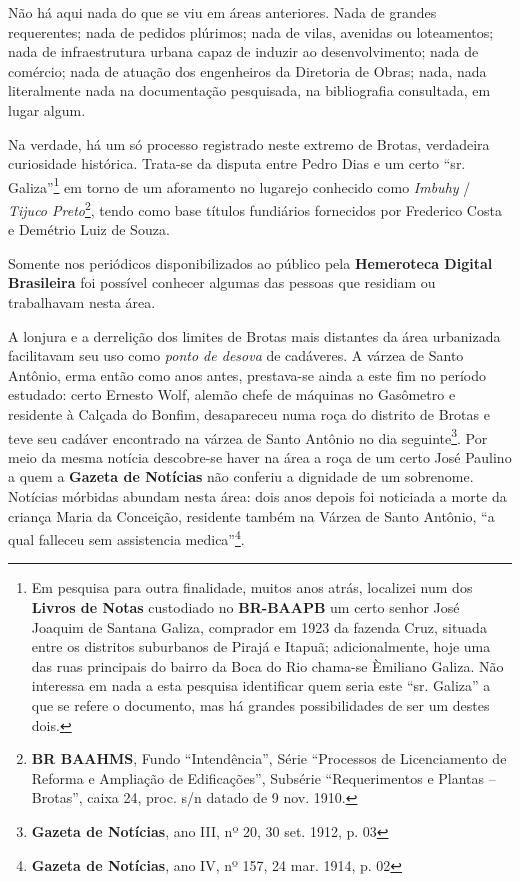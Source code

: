 



Não há aqui nada do que se viu em áreas anteriores. Nada de grandes requerentes; nada de pedidos plúrimos; nada de vilas, avenidas ou loteamentos; nada de infraestrutura urbana capaz de induzir ao desenvolvimento; nada de comércio; nada de atuação dos engenheiros da Diretoria de Obras; nada, nada literalmente nada na documentação pesquisada, na bibliografia consultada, em lugar algum. 

Na verdade, há um só processo registrado neste extremo de Brotas, verdadeira curiosidade histórica. Trata-se da disputa entre Pedro Dias e um certo ``sr. Galiza''\footnote{Em pesquisa para outra finalidade, muitos anos atrás, localizei num dos \textbf{Livros de Notas} custodiado no \textbf{BR-BAAPB} um certo senhor José Joaquim de Santana Galiza, comprador em 1923 da fazenda Cruz, situada entre os distritos suburbanos de Pirajá e Itapuã; adicionalmente, hoje uma das ruas principais do bairro da Boca do Rio chama-se Èmiliano Galiza. Não interessa em nada a esta pesquisa identificar quem seria este ``sr. Galiza'' a que se refere o documento, mas há grandes possibilidades de ser um destes dois.} em torno de um aforamento no lugarejo conhecido como \textit{Imbuhy} / \textit{Tijuco Preto}\footnote{\textbf{BR BAAHMS}, Fundo ``Intendência'', Série ``Processos de Licenciamento de Reforma e Ampliação de Edificações'', Subsérie ``Requerimentos e Plantas -- Brotas'', caixa 24, proc. s/n datado de 9 nov. 1910.}, tendo como base títulos fundiários fornecidos por Frederico Costa e Demétrio Luiz de Souza.


Somente nos periódicos disponibilizados ao público pela \textbf{Hemeroteca Digital Brasileira} foi possível conhecer algumas das pessoas que residiam ou trabalhavam nesta área.

A lonjura e a derrelição dos limites de Brotas mais distantes da área urbanizada facilitavam seu uso como \textit{ponto de desova} de cadáveres. A várzea de Santo Antônio, erma então como anos antes, prestava-se ainda a este fim no período estudado: certo Ernesto Wolf, alemão chefe de máquinas no Gasômetro e residente à Calçada do Bonfim, desapareceu numa roça do distrito de Brotas e teve seu cadáver encontrado na várzea de Santo Antônio no dia seguinte\footnote{\textbf{Gazeta de Notícias}, ano III, nº 20, 30 set. 1912, p. 03}. Por meio da mesma notícia descobre-se haver na área a roça de um certo José Paulino a quem a \textbf{Gazeta de Notícias} não conferiu a dignidade de um sobrenome. Notícias mórbidas abundam nesta área: dois anos depois foi noticiada a morte da criança Maria da Conceição, residente também na Várzea de Santo Antônio, ``a qual falleceu sem assistencia medica''\footnote{\textbf{Gazeta de Notícias}, ano IV, nº 157, 24 mar. 1914, p. 02}.

